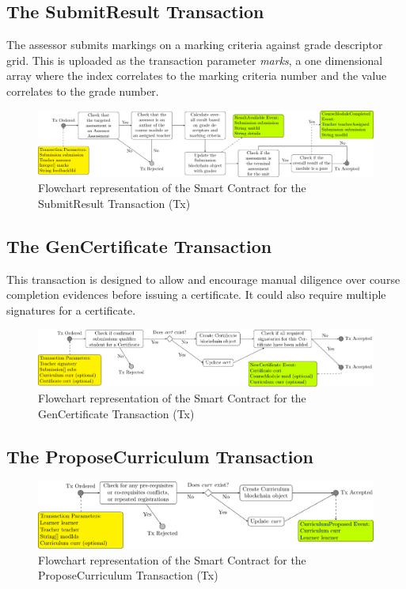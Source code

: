 \subsection{The SubmitResult Transaction}

The assessor submits markings on a marking criteria against grade descriptor grid. This is uploaded as the transaction
parameter \textit{marks}, a one dimensional array where the index correlates to the marking criteria number and
the value correlates to the grade number.

\begin{figure}[!ht]
	\centering
	\includegraphics[width=1.0\textwidth]{srtx}
	\caption[SubmitResult Transaction flowchart]
	{Flowchart representation of the Smart Contract for the SubmitResult Transaction (Tx)} \label{fig:srtx}
\end{figure}

\subsection{The GenCertificate Transaction}

This transaction is designed to allow and encourage manual diligence over course completion evidences before issuing a certificate.
It could also require multiple signatures for a certificate.

\begin{figure}[!ht]
	\centering
	\includegraphics[width=1.0\textwidth]{gctx}
	\caption[GenCertificate Transaction flowchart]
	{Flowchart representation of the Smart Contract for the GenCertificate Transaction (Tx)} \label{fig:gctx}
\end{figure}

\subsection{The ProposeCurriculum Transaction}

\begin{figure}[!ht]
	\centering
	\includegraphics[width=1.0\textwidth]{pctx}
	\caption[ProposeCurriculum Transaction flowchart]
	{Flowchart representation of the Smart Contract for the ProposeCurriculum Transaction (Tx)} \label{fig:pctx}
\end{figure}

